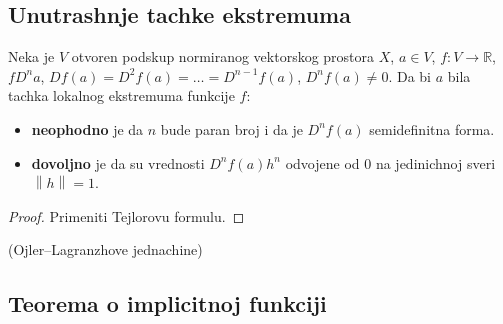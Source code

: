 \documentclass[a4paper,12pt]{article}
\newcommand{\R}{\mathbb{R}}
\newcommand{\norm}[1]{\left\lVert#1\right\rVert}
\begin{document}
\subsection{Unutrashnje tachke ekstremuma}

\begin{tvr}
	Neka je $V$ otvoren podskup normiranog vektorskog prostora $X$, $a \in V$, $f:V\to \R$, $f D^n a$,
	$Df(a) = D^2f(a) = \dotso = D^{n-1}f(a)$, $D^n f(a) \neq 0 $. Da bi $a$ bila tachka lokalnog ekstremuma
    funkcije $f$:
	\begin{itemize}
		\item \textbf{neophodno} je da $n$ bude paran broj i da je $D^nf(a)$ semidefinitna forma.
		\item \textbf{dovoljno} je da su vrednosti $D^nf(a)h^n$ odvojene od $0$ na jedinichnoj sveri $\norm h = 1$.
	\end{itemize}
\end{tvr}
\begin{proof}
	Primeniti Tejlorovu formulu.
\end{proof}


\begin{pr}(Ojler--Lagranzhove jednachine)
\end{pr}

\subsection{Teorema o implicitnoj funkciji}
\end{document}
